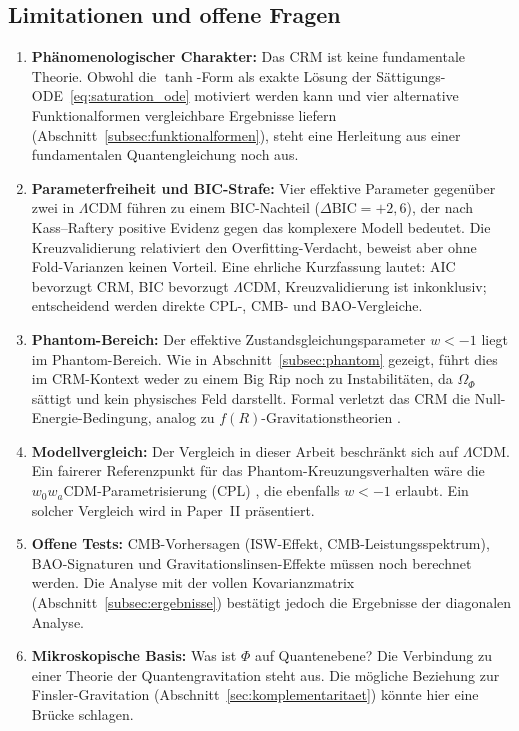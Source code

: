 \documentclass[aps,prd,twocolumn,superscriptaddress,nofootinbib]{revtex4-2}
\begin{document}
\subsection{Limitationen und offene Fragen}

\begin{enumerate}
\item \textbf{Ph\"anomenologischer Charakter:} Das CRM ist keine fundamentale Theorie. Obwohl die $\tanh$-Form als exakte L\"osung der S\"attigungs-ODE~\eqref{eq:saturation_ode} motiviert werden kann und vier alternative Funktionalformen vergleichbare Ergebnisse liefern (Abschnitt~\ref{subsec:funktionalformen}), steht eine Herleitung aus einer fundamentalen Quantengleichung noch aus.
\item \textbf{Parameterfreiheit und BIC-Strafe:} Vier effektive Parameter gegenüber zwei in $\Lambda$CDM führen zu einem BIC-Nachteil ($\Delta\mathrm{BIC} = +2{,}6$), der nach Kass--Raftery positive Evidenz gegen das komplexere Modell bedeutet. Die Kreuzvalidierung relativiert den Overfitting-Verdacht, beweist aber ohne Fold-Varianzen keinen Vorteil. Eine ehrliche Kurzfassung lautet: AIC bevorzugt CRM, BIC bevorzugt $\Lambda$CDM, Kreuzvalidierung ist inkonklusiv; entscheidend werden direkte CPL-, CMB- und BAO-Vergleiche.
\item \textbf{Phantom-Bereich:} Der effektive Zustandsgleichungsparameter $w < -1$ liegt im Phantom-Bereich. Wie in Abschnitt~\ref{subsec:phantom} gezeigt, f\"uhrt dies im CRM-Kontext weder zu einem Big Rip noch zu Instabilit\"aten, da $\Omega_\Phi$ s\"attigt und kein physisches Feld darstellt. Formal verletzt das CRM die Null-Energie-Bedingung, analog zu $f(R)$-Gravitationstheorien \cite{Sotiriou2010}.
\item \textbf{Modellvergleich:} Der Vergleich in dieser Arbeit beschr\"ankt sich auf $\Lambda$CDM. Ein fairerer Referenzpunkt f\"ur das Phantom-Kreuzungsverhalten w\"are die $w_0w_a$CDM-Parametrisierung (CPL) \cite{Chevallier2001, Linder2003}, die ebenfalls $w < -1$ erlaubt. Ein solcher Vergleich wird in Paper~II pr\"asentiert.
\item \textbf{Offene Tests:} CMB-Vorhersagen (ISW-Effekt, CMB-Leistungsspektrum), BAO-Signaturen und Gravitationslinsen-Effekte m\"ussen noch berechnet werden. Die Analyse mit der vollen Kovarianzmatrix (Abschnitt~\ref{subsec:ergebnisse}) best\"atigt jedoch die Ergebnisse der diagonalen Analyse.
\item \textbf{Mikroskopische Basis:} Was ist $\Phi$ auf Quantenebene? Die Verbindung zu einer Theorie der Quantengravitation steht aus. Die m\"ogliche Beziehung zur Finsler-Gravitation (Abschnitt~\ref{sec:komplementaritaet}) k\"onnte hier eine Br\"ucke schlagen.

\end{enumerate}
\end{document}
